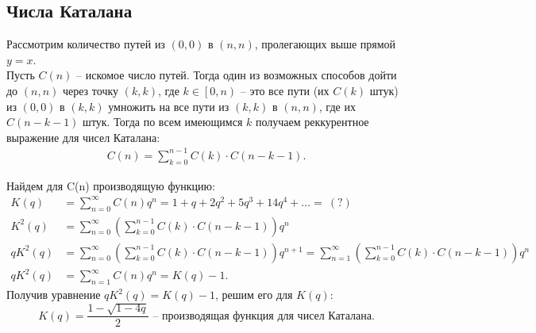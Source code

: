 \documentclass[a0paper,portrait]{baposter}
\begin{document}
\begin{poster}
{{\subsection*{Числа Каталана}
Рассмотрим количество путей из $\left( 0, 0 \right) $ в $\left( n, n \right) $,
пролегающих выше прямой $y = x$. \\
Пусть $C(n)$ – искомое число путей. Тогда один из возможных способов дойти до
$\left(n, n\right) $ через точку $\left( k, k \right)$, где $k  \in \left[0, n\right)$ – это
все пути (их $C(k) $ штук) из $\left( 0, 0 \right) $ в $\left( k, k \right) $
умножить на все пути из $\left( k, k \right) $ в $\left( n, n \right) $, где их
$C(n - k - 1) $ штук. Тогда по всем имеющимся $k$ получаем реккурентное выражение для 
чисел Каталана:
\begin{align*}
	C(n) = \sum_{k=0}^{n - 1} C(k) \cdot  C(n - k - 1).
\end{align*}

Найдем для C(n) производящую функцию:
\begin{align*}
	K(q) &= \sum_{n=0}^{\infty} C(n)q^n = 1 + q + 2q^2 + 5q^3 + 14q^4 + \ldots = \ \left(?\right)\\
	K^2(q) &= \sum_{n=0}^{\infty}\left( \sum_{k=0}^{n - 1}C(k) \cdot C(n - k - 1) \right) q^n \\
	qK^2(q) & = \sum_{n=0}^{\infty}\left( \sum_{k=0}^{n - 1}C(k) \cdot C(n - k - 1) \right) q^{n + 1} =
	\sum_{n=1}^{\infty}\left( \sum_{k=0}^{n - 1}C(k) \cdot C(n - k - 1) \right) q^n \\
	qK^2(q) &= \sum_{n=1}^{\infty} C(n)q^n = K(q) - 1
.\end{align*}
Получив уравнение $qK^2(q) = K(q) - 1$, решим его для $K(q)$:
\[
	K(q) = \frac{1 - \sqrt{1 - 4q}}{2} \text{ – производящая функция для чисел Каталана.} 
\] 
}
}




\end{poster}
\end{document}
